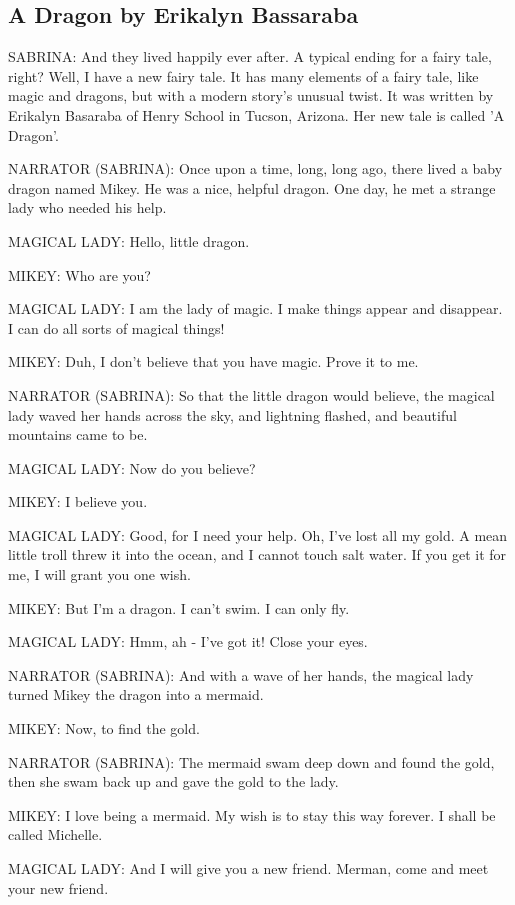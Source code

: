 \subsection{A Dragon by Erikalyn Bassaraba}

SABRINA:
And they lived happily ever after.
A typical ending for a fairy tale, right?
Well, I have a new fairy tale.
It has many elements of a fairy tale, like magic and dragons, but with a modern story's unusual twist.
It was written by Erikalyn Basaraba of Henry School in Tucson, Arizona.
Her new tale is called 'A Dragon'.

NARRATOR (SABRINA):
Once upon a time, long, long ago, there lived a baby dragon named Mikey.
He was a nice, helpful dragon.
One day, he met a strange lady who needed his help.

MAGICAL LADY:
Hello, little dragon.

MIKEY:
Who are you?

MAGICAL LADY:
I am the lady of magic.
I make things appear and disappear.
I can do all sorts of magical things!

MIKEY:
Duh, I don't believe that you have magic.
Prove it to me.

NARRATOR (SABRINA):
So that the little dragon would believe, the magical lady waved her hands across the sky, and lightning flashed, and beautiful mountains came to be.

MAGICAL LADY:
Now do you believe?

MIKEY:
I believe you.

MAGICAL LADY:
Good, for I need your help.
Oh, I've lost all my gold.
A mean little troll threw it into the ocean, and I cannot touch salt water.
If you get it for me, I will grant you one wish.

MIKEY:
But I'm a dragon.
I can't swim.
I can only fly.

MAGICAL LADY:
Hmm, ah - I've got it!
Close your eyes.

NARRATOR (SABRINA):
And with a wave of her hands, the magical lady turned Mikey the dragon into a mermaid.

MIKEY:
Now, to find the gold.

NARRATOR (SABRINA):
The mermaid swam deep down and found the gold, then she swam back up and gave the gold to the lady.

MIKEY:
I love being a mermaid.
My wish is to stay this way forever.
I shall be called Michelle.

MAGICAL LADY:
And I will give you a new friend.
Merman, come and meet your new friend.


